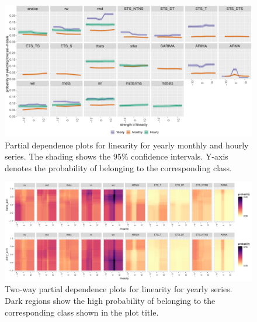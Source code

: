 \documentclass[11pt,a4paper,]{article}
\begin{document}
\begin{figure}[h]

{\centering \includegraphics[width=\textwidth]{figure/linearity-1} 

}

\caption{Partial dependence plots for linearity for yearly monthly and hourly series. The shading shows the 95\% confidence intervals. Y-axis denotes the probability of belonging to the corresponding class. }\label{fig:linearity}
\end{figure}

\begin{figure}[h]

{\centering \includegraphics[width=\textwidth]{figure/y2dpdp-1} 

}

\caption{Two-way partial dependence plots for linearity for yearly series. Dark regions show the high probability of belonging to the corresponding class shown in the plot title.}\label{fig:y2dpdp}
\end{figure}
\end{document}
